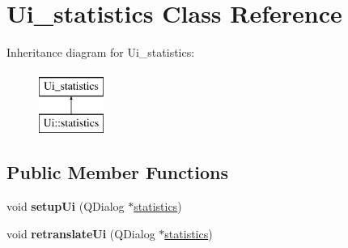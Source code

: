 \hypertarget{classUi__statistics}{
\section{Ui\_\-statistics Class Reference}
\label{classUi__statistics}
}
Inheritance diagram for Ui\_\-statistics:\begin{figure}[H]
\begin{center}
\leavevmode
\includegraphics[height=2.000000cm]{classUi__statistics}
\end{center}
\end{figure}
\subsection*{Public Member Functions}
\begin{DoxyCompactItemize}
\item 
\hypertarget{classUi__statistics_aacd569dc59afc13bd3eff1fcc284f59c}{
void {\bfseries setupUi} (QDialog $\ast$\hyperlink{classstatistics}{statistics})}
\label{classUi__statistics_aacd569dc59afc13bd3eff1fcc284f59c}

\item 
\hypertarget{classUi__statistics_a6abd5ef03edf8c68e99b5d3d19707ed0}{
void {\bfseries retranslateUi} (QDialog $\ast$\hyperlink{classstatistics}{statistics})}
\label{classUi__statistics_a6abd5ef03edf8c68e99b5d3d19707ed0}

\end{DoxyCompactItemize}
